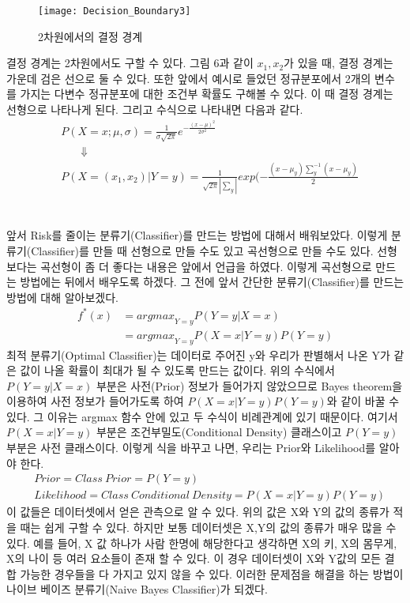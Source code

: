 \documentclass[a4paper]{oblivoir}
\begin{document}
\begin{figure}[ht]\centering
\texttt{[image: Decision\_Boundary3]}\caption{2차원에서의 결정 경계}\label{Fig:3-6}
\end{figure}
\indent 결정 경계는 2차원에서도 구할 수 있다. 그림 6과 같이 $x_1,x_2$가 있을 때, 결정 경계는 가운데 검은 선으로 둘 수 있다. 또한 앞에서 예시로 들었던 정규분포에서 2개의 변수를 가지는 다변수 정규분포에 대한 조건부 확률도 구해볼 수 있다. 이 때 결정 경계는 선형으로 나타나게 된다. 그리고 수식으로 나타내면 다음과 같다.
\begin{equation}
\begin{split}
&P(X=x;\mu ,\sigma)=\frac{1}{\sigma\sqrt{2\pi}}e^{-\frac{(x-\mu)^2}{2\sigma^2}}\\
&\ \ \ \ \ \ \ \ \Downarrow\\
&P(X=(x_1,x_2)|Y=y)=\frac{1}{\sqrt{2\pi}| \sum_y |}exp(-\frac{(x-\mu_y)\sum_{y}^{-1}(x-\mu_y)}{2}
\end{split}
\end{equation}
\\\\
\indent 앞서 Risk를 줄이는 분류기(Classifier)를 만드는 방법에 대해서 배워보았다. 이렇게 분류기(Classifier)를 만들 때 선형으로 만들 수도 있고 곡선형으로 만들 수도 있다. 선형보다는 곡선형이 좀 더 좋다는 내용은 앞에서 언급을 하였다. 이렇게 곡선형으로 만드는 방법에는 뒤에서 배우도록 하겠다. 그 전에 앞서 간단한 분류기(Classifier)를 만드는 방법에 대해 알아보겠다.
\begin{equation}
\begin{split}
f^*(x)&={argmax}_{Y=y}P(Y=y|X=x)\\
&={argmax}_{Y=y} P(X=x|Y=y)P(Y=y)
\end{split}
\end{equation}
\indent 최적 분류기(Optimal Classifier)는 데이터로 주어진 y와 우리가 판별해서 나온 Y가 같은 값이 나올 확률이 최대가 될 수 있도록 만드는 값이다. 위의 수식에서 $P(Y=y|X=x)$ 부분은 사전(Prior) 정보가 들어가지 않았으므로 Bayes theorem을 이용하여 사전 정보가 들어가도록 하여  $P(X=x|Y=y)P(Y=y)$와 같이 바꿀 수 있다. 그 이유는 argmax 함수 안에 있고 두 수식이 비례관계에 있기 때문이다. 여기서 $P(X=x|Y=y)$ 부분은 조건부밀도(Conditional Density) 클래스이고 $P(Y=y)$ 부분은 사전 클래스이다. 이렇게 식을 바꾸고 나면, 우리는 Prior와 Likelihood를 알아야 한다. 
\begin{align}
&Prior=Class\ Prior=P(Y=y)\\
&Likelihood=Class\ Conditional\ Density=P(X=x|Y=y)P(Y=y)
\end{align}
\indent 이 값들은 데이터셋에서 얻은 관측으로 알 수 있다. 위의 값은 X와 Y의 값의 종류가 적을 때는 쉽게 구할 수 있다. 하지만 보통 데이터셋은 X,Y의 값의 종류가 매우 많을 수 있다. 예를 들어, X 값 하나가 사람 한명에 해당한다고 생각하면 X의 키, X의 몸무게, X의 나이 등 여러 요소들이 존재 할 수 있다. 이 경우 데이터셋이 X와 Y값의 모든 결합 가능한 경우들을 다 가지고 있지 않을 수 있다. 이러한 문제점을 해결을 하는 방법이 나이브 베이즈 분류기(Naive Bayes Classifier)가 되겠다.\\\\
\end{document}
